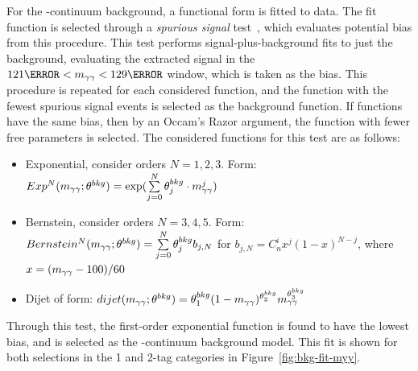 For the \yy-continuum background, a functional form is fitted to data. The fit function is selected through a \textit{spurious signal} test~\cite{spurious-signal-diphoton}, which evaluates potential bias from this procedure. This test performs signal-plus-background fits to just the background, evaluating the extracted signal in the $\unit{121}{\GeV} < \myy < \unit{129}{\GeV}$ window, which is taken as the bias. This procedure is repeated for each considered function, and the function with the fewest spurious signal events is selected as the background function. If functions have the same bias, then by an Occam's Razor argument, the function with fewer free parameters is selected. The considered functions for this test are as follows:
\begin{itemize}
  \item Exponential, consider orders $N=1,2,3$. Form: ${Exp^N (m_{\gamma\gamma} ; \theta^{bkg}) = \exp(\sum\limits_{j=0}^{N} \theta_j^{bkg} \cdot m_{\gamma\gamma}^j)}$
  \item Bernstein, consider orders $N=3,4,5$. Form: ${Bernstein^N (m_{\gamma\gamma} ; \theta^{bkg}) = \sum\limits_{j=0}^{N} \theta_j^{bkg} b_{j,N}}$ for ${b_{j,N} = C_n^i x^j (1-x)^{N-j}}$, where ${x= (m_{\gamma\gamma}-100)/60}$
  \item Dijet of form: ${dijet(m_{\gamma\gamma} ; \theta^{bkg}) = \theta_1^{bkg} (1-m_{\gamma\gamma})^{\theta_2^{bkg}} m_{\gamma\gamma}^{\theta_3^{bkg}}}$
\end{itemize}

Through this test, the first-order exponential function is found to have the lowest bias, and is selected as the \yy-continuum background model. This fit is shown for both selections in the 1 and 2-tag categories in Figure~\ref{fig:bkg-fit-myy}.


